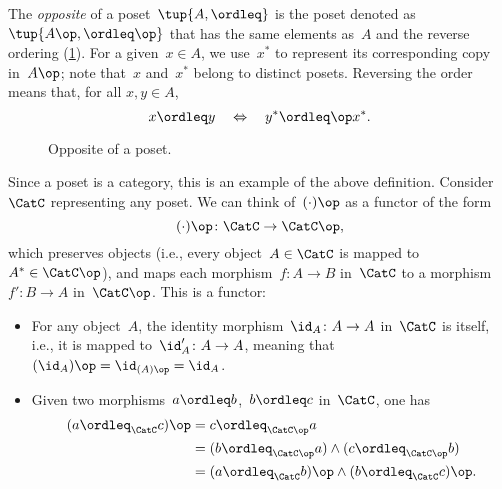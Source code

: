 \begin{example}
    The \emph{opposite} of a poset~$\tup{A, \ordleq} $ is the poset denoted as~$\tup{A\op, \ordleq\op}$ that has the same elements as~$A$ and the reverse ordering (\cref{fig:opposite}).
    For a given~$x \in A$, we use~$x^*$ to represent its corresponding copy in~$A\op$;
    note that~$x$ and~$x^*$ belong to distinct posets.
    Reversing the order means that, for all $x,y\in A$,
    \begin{equation}
        x \ordleq y \quad \Leftrightarrow \quad y^* \ordleq\op x^*.
    \end{equation}
    \begin{figure}[tbh]
        \centering
        \caption{Opposite of a poset.\label{fig:opposite}}
    \end{figure}
    Since a poset is a category, this is an example of the above definition. Consider~$\CatC$ representing any poset. We can think of~$(\cdot)\op$ as a functor of the form
    \begin{equation}
        (\cdot)\op\colon \CatC \to \CatC\op,
    \end{equation}
    which preserves objects (i.e., every object~$A \in \CatC$ is mapped to~$A^*\in \CatC\op$), and maps each morphism~$f\colon A\to B$ in~$\CatC$ to a morphism~$f'\colon B\to A$ in~$\CatC\op$. This is a functor:
    \begin{itemize}
        \item For any object~$A$, the identity morphism~$\id_A\colon A\to A$ in~$\CatC$ is itself, i.e., it is mapped to~$\id_A'\colon A\to A$, meaning that~$(\id_A)\op=\id_{(A)\op}=\id_A$.
        \item Given two morphisms~$a\ordleq b$,~$b\ordleq c$ in~$\CatC$, one has
        \begin{equation}
            \begin{aligned}
                (a\ordleq_{\CatC} c)\op &=c\ordleq_{\CatC\op} a\\
                &=(b\ordleq_{\CatC\op} a)\wedge (c\ordleq_{\CatC\op}b)\\
                &=(a\ordleq_{\CatC} b)\op \wedge (b\ordleq_{\CatC} c)\op.
            \end{aligned}
        \end{equation}
    \end{itemize}
\end{example}

